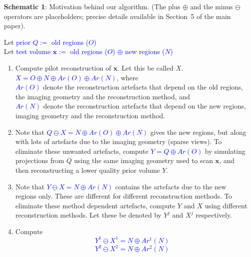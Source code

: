 \documentclass{article}
\begin{document}
\noindent \begin{boxedminipage}{\textwidth} 
{\bf Schematic 1}: Motivation behind our algorithm. (The plus $\oplus$ and the
minus $\ominus$ operators are placeholders; precise details available
in Section~5 of the main paper). 

{\small
 Let \textcolor{blue}{prior $Q:=$ old regions ($O$)}\\
 Let \textcolor{blue}{test volume $\boldsymbol{x}:=$ old regions ($O$) $\oplus$ new regions ($N$)}\\
    \begin{enumerate}
\item  Compute pilot reconstruction of $\boldsymbol{x}$. Let this be called $X$.\\ \textcolor{blue}{$X = O \oplus N \oplus Ar(O) \oplus Ar(N)$}, where \\ \textcolor{blue}{$Ar(O)$} denote the reconstruction artefacts that depend on the old regions, the imaging geometry and the reconstruction method, and\\
 \textcolor{blue}{$Ar(N)$} denote the reconstruction artefacts that depend on the new regions, imaging geometry and the reconstruction method.
\item  Note that \textcolor{blue}{$Q \ominus X = N \oplus Ar(O) \oplus Ar(N)$} gives the new regions, but along with lots of artefacts due to the imaging geometry (sparse views). To eliminate these unwanted artefacts, compute \textcolor{blue}{$Y = Q \oplus Ar(O)$} by simulating projections from $Q$ using the same imaging geometry used to scan $\boldsymbol{x}$, and then reconstructing a lower quality prior volume $Y$. 
    \item Note that \textcolor{blue}{$Y \ominus X = N \oplus Ar(N)$} contains the artefacts due to the new regions only. These are different for different reconstruction methods. To eliminate these method dependent artefacts, compute $Y$ and $X$ using different reconstruction methods. Let these be denoted by $Y^j$ and $X^j$ respectively.
    \item Compute
\vspace{-0.2cm}
           \textcolor{blue}{\begin{equation*}
            Y^1 \ominus X^1 = N \oplus Ar^1(N)
           \end{equation*}
\vspace{-0.5cm}
           \begin{equation*}
            Y^2 \ominus X^2 = N \oplus Ar^2(N)

\end{equation*}}
\end{enumerate}}
\end{boxedminipage}
\end{document}
